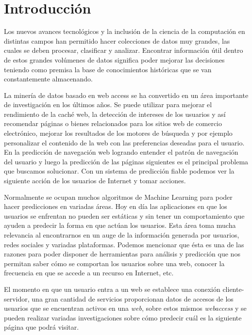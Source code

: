 \chapter[Introducción]{Introducción}
\label{ch:intro}

{
Los nuevos avances tecnológicos y la inclusión de la ciencia de la computación en distintas campos han permitido hacer colecciones de datos muy grandes, las cuales se deben procesar, clasificar y analizar. Encontrar información útil dentro de estos grandes volúmenes de datos significa poder mejorar las decisiones teniendo como premisa la base de conocimientos históricas que se van constantemente almacenando.

La minería de datos basado en web access se ha convertido en un área importante de investigación en los últimos años. Se puede utilizar para mejorar el rendimiento de la caché web, la detección de intereses de los usuarios y así recomendar páginas o bienes relacionados para los sitios web de comercio electrónico, mejorar los resultados de los motores de búsqueda y por ejemplo personalizar el contenido de la web con las preferencias deseadas para el usuario. En la predicción de navegación web logrando entender el patrón de navegación del usuario y luego la predicción de las páginas siguientes es el principal problema que buscamos solucionar. Con un sistema de predicción fiable podemos ver la siguiente acción de los usuarios de Internet y tomar acciones. 


Normalmente se ocupan muchos algoritmos de Machine Learning para poder hacer predicciones en variadas áreas. Hoy en día las aplicaciones en que los usuarios se enfrentan no pueden ser estáticas y sin tener un comportamiento que ayuden a predecir la forma en que actúan los usuarios. Esta área toma mucha relevancia al encontrarnos en un auge de la información generada por usuarios, redes sociales y variadas plataformas. Podemos mencionar que ésta es una de las razones para poder disponer de herramientas para análisis y predicción que nos permitan saber cómo se comportan los usuarios sobre una web, conocer la frecuencia en que se accede a un recurso en Internet, etc. 

El momento en que un usuario entra a un web se establece una conexión cliente-servidor, una gran cantidad de servicios proporcionan datos de accesos de los usuarios que se encuentran activos en una \emph{web}, sobre estos mismos \emph{webaccess} y se pueden realizar variadas investigaciones sobre cómo predecir cuál es la siguiente página que podrá visitar. 


}
